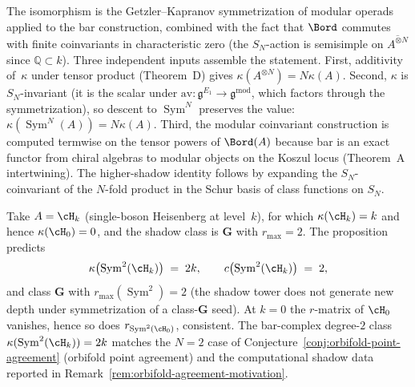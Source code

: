 \begin{remark}
\label{rem:bar-sym-n-attribution}
The isomorphism is the Getzler--Kapranov symmetrization of
modular operads applied to the bar construction, combined
with the fact that $\Bord$ commutes with finite coinvariants
in characteristic zero (the $S_N$-action is semisimple on
$\overline{A^{\otimes N}}$ since $\mathbb{Q} \subset k$).
Three independent inputs assemble the statement.
First, additivity of~$\kappa$ under tensor product
(Theorem~D) gives
$\kappa(A^{\otimes N}) = N\kappa(A)$.
Second, $\kappa$ is $S_N$-invariant
(it is the scalar under $\mathrm{av} \colon
\mathfrak{g}^{E_1} \to \mathfrak{g}^{\mathrm{mod}}$, which
factors through the symmetrization), so descent to
$\operatorname{Sym}^N$ preserves the value:
$\kappa(\operatorname{Sym}^N(A)) = N\kappa(A)$.
Third, the modular coinvariant construction is computed
termwise on the tensor powers of $\Bord(A)$ because bar is
an exact functor from chiral algebras to modular objects on
the Koszul locus (Theorem~A intertwining). The
higher-shadow identity follows by expanding the
$S_N$-coinvariant of the $N$-fold product in the Schur basis
of class functions on $S_N$.
\end{remark}

\begin{computation}[$N=2$ Heisenberg verification]
\label{comp:bar-sym-2-heisenberg}
Take $A = \cH_k$ (single-boson Heisenberg at level~$k$),
for which $\kappa(\cH_k) = k$ and hence $\kappa(\cH_0) = 0$,
and the shadow class
is $\mathbf{G}$ with $r_{\max} = 2$. The proposition
predicts
\[
 \kappa\bigl(\operatorname{Sym}^2(\cH_k)\bigr) \;=\; 2k,
 \qquad
 c\bigl(\operatorname{Sym}^2(\cH_k)\bigr) \;=\; 2,
\]
and class $\mathbf{G}$ with $r_{\max}(\operatorname{Sym}^2)
= 2$ (the shadow tower does not generate new depth under
symmetrization of a class-$\mathbf{G}$ seed). At $k = 0$
the $r$-matrix of $\cH_0$ vanishes, hence so does
$r_{\operatorname{Sym}^2(\cH_0)}$, consistent.
The bar-complex degree-$2$ class
$\kappa(\operatorname{Sym}^2(\cH_k)) = 2k$ matches the
$N = 2$ case of
Conjecture~\ref{conj:orbifold-point-agreement}
(orbifold point agreement) and the computational shadow
data reported in
Remark~\ref{rem:orbifold-agreement-motivation}.
\end{computation}

